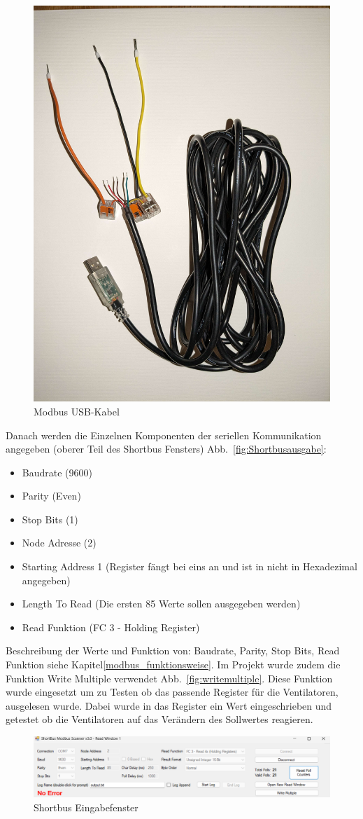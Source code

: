 \begin{figure}[H]
	\centering
	\includegraphics[width=0.3\linewidth]{Bilder/modbus_usbkabel}
	\caption{Modbus USB-Kabel} 
	\label{fig:modbus_usbkabel}
\end{figure}

Danach werden die Einzelnen Komponenten der seriellen Kommunikation angegeben (oberer Teil des Shortbus Fensters) Abb.~\ref{fig:Shortbusausgabe}:
\begin{itemize}
	\item Baudrate (9600)
	\item Parity (Even)
	\item Stop Bits (1)
	\item Node Adresse (2)
	\item Starting Address 1 (Register fängt bei eins an und ist in nicht in Hexadezimal angegeben)
	\item Length To Read (Die ersten 85 Werte sollen ausgegeben werden)
	\item Read Funktion (FC 3 - Holding Register)
\end{itemize}

Beschreibung der Werte und Funktion von: Baudrate, Parity, Stop Bits, Read Funktion siehe Kapitel\ref{modbus_funktionsweise}.
Im Projekt wurde zudem die Funktion Write Multiple verwendet Abb.~\ref{fig:writemultiple}. Diese Funktion wurde eingesetzt um zu Testen ob das passende Register für \zB die Ventilatoren, ausgelesen wurde. Dabei wurde in das Register ein Wert eingeschrieben und getestet ob die Ventilatoren auf das Verändern des Sollwertes reagieren.

\begin{figure}[H]
	\centering
	\includegraphics[width=1\linewidth]{Bilder/shortbus_eingabe}
	\caption{Shortbus Eingabefenster} 
	\label{fig:Shortbuseingabe}
\end{figure}


